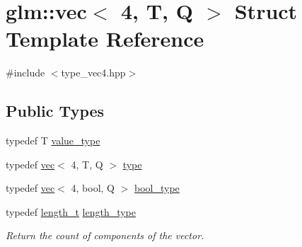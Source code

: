 \hypertarget{structglm_1_1vec_3_014_00_01_t_00_01_q_01_4}{}\section{glm\+:\+:vec$<$ 4, T, Q $>$ Struct Template Reference}
\label{structglm_1_1vec_3_014_00_01_t_00_01_q_01_4}


{\ttfamily \#include $<$type\+\_\+vec4.\+hpp$>$}

\subsection*{Public Types}
\begin{DoxyCompactItemize}
\item 
typedef T \mbox{\hyperlink{structglm_1_1vec_3_014_00_01_t_00_01_q_01_4_a020e92356dcff10cc371130596325415}{value\+\_\+type}}
\item 
typedef \mbox{\hyperlink{structglm_1_1vec}{vec}}$<$ 4, T, Q $>$ \mbox{\hyperlink{structglm_1_1vec_3_014_00_01_t_00_01_q_01_4_ab2b893dfe27b0d0f154d66315f35de47}{type}}
\item 
typedef \mbox{\hyperlink{structglm_1_1vec}{vec}}$<$ 4, bool, Q $>$ \mbox{\hyperlink{structglm_1_1vec_3_014_00_01_t_00_01_q_01_4_a175b3fdeb819aab912118ac1605b675b}{bool\+\_\+type}}
\item 
typedef \mbox{\hyperlink{namespaceglm_a090a0de2260835bee80e71a702492ed9}{length\+\_\+t}} \mbox{\hyperlink{structglm_1_1vec_3_014_00_01_t_00_01_q_01_4_af1c8f56963141951f4a4724b47e072d9}{length\+\_\+type}}
\begin{DoxyCompactList}\small\item\em Return the count of components of the vector. \end{DoxyCompactList}\end{DoxyCompactItemize}
